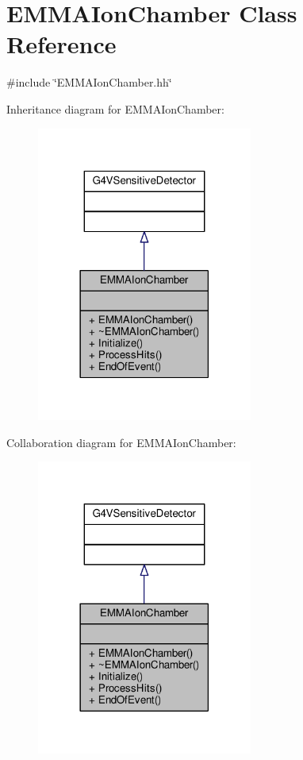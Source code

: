 \hypertarget{classEMMAIonChamber}{}\section{E\+M\+M\+A\+Ion\+Chamber Class Reference}
\label{classEMMAIonChamber}


{\ttfamily \#include \char`\"{}E\+M\+M\+A\+Ion\+Chamber.\+hh\char`\"{}}



Inheritance diagram for E\+M\+M\+A\+Ion\+Chamber\+:
\nopagebreak
\begin{figure}[H]
\begin{center}
\leavevmode
\includegraphics[width=201pt]{classEMMAIonChamber__inherit__graph}
\end{center}
\end{figure}


Collaboration diagram for E\+M\+M\+A\+Ion\+Chamber\+:
\nopagebreak
\begin{figure}[H]
\begin{center}
\leavevmode
\includegraphics[width=201pt]{classEMMAIonChamber__coll__graph}
\end{center}
\end{figure}
